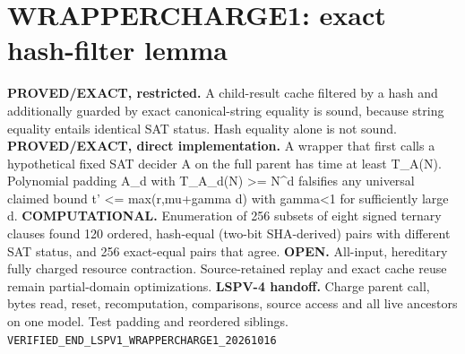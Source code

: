 \section*{WRAPPERCHARGE1: exact hash-filter lemma}
\textbf{PROVED/EXACT, restricted.} A child-result cache filtered by a hash and additionally guarded by exact canonical-string equality is sound, because string equality entails identical SAT status. Hash equality alone is not sound.
\textbf{PROVED/EXACT, direct implementation.} A wrapper that first calls a hypothetical fixed SAT decider A on the full parent has time at least T_A(N). Polynomial padding A_d with T_{A_d}(N) >= N^d falsifies any universal claimed bound t' <= max(r,mu+gamma d) with gamma<1 for sufficiently large d.
\textbf{COMPUTATIONAL.} Enumeration of 256 subsets of eight signed ternary clauses found 120 ordered, hash-equal (two-bit SHA-derived) pairs with different SAT status, and 256 exact-equal pairs that agree.
\textbf{OPEN.} All-input, hereditary fully charged resource contraction. Source-retained replay and exact cache reuse remain partial-domain optimizations.
\textbf{LSPV-4 handoff.} Charge parent call, bytes read, reset, recomputation, comparisons, source access and all live ancestors on one model. Test padding and reordered siblings.
\texttt{VERIFIED_END_LSPV1_WRAPPERCHARGE1_20261016}
